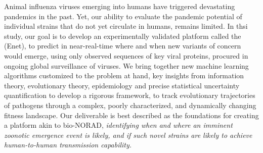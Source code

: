 \documentclass[onecolumn, compsoc,10pt]{IEEEtran}
\begin{document}
\pagestyle{empty}


{\bf  \TITLE}

Animal influenza  viruses emerging into humans %
have triggered devastating  pandemics in the past. Yet, our ability to evaluate the pandemic potential of individual strains that do not yet circulate in humans, remains limited. In thsi study,  our goal is to develop an experimentally  validated platform called the \enet (Enet), to predict in near-real-time where and when  new variants of concern would emerge,  using only observed  sequences  of key viral proteins, procured in ongoing global surveillance of \infl viruses. We bring together new machine learning algorithms customized to the problem at hand, key insights from information theory, evolutionary theory, epidemiology and precise statistical  uncertainty quantification to develop a rigorous framework, to  track evolutionary trajectories of pathogens through a complex, poorly characterized, and dynamically changing fitness landscape. Our deliverable is best described as the foundations for creating a platform akin to bio-NORAD,  \textit{identifying when and where an imminent zoonotic emergence event is likely, and if such novel strains are likely to achieve human-to-human transmission capability.}


\end{document}
